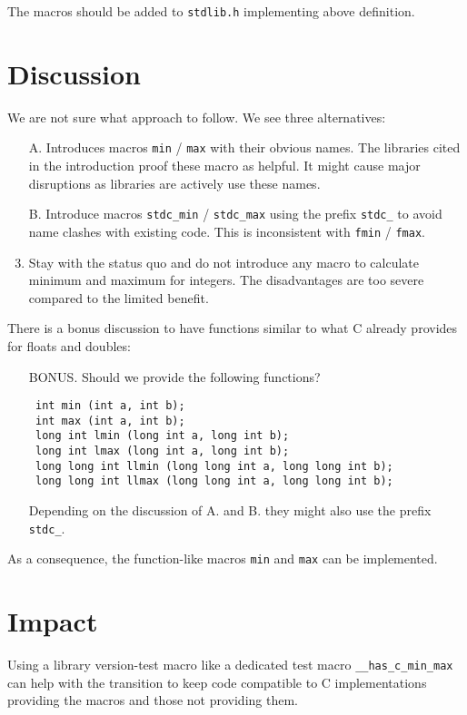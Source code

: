 \documentclass[a4paper,10pt]{scrartcl}
\begin{document}
The macros should be added to \lstinline{stdlib.h} implementing above definition.

\section{Discussion}
We are not sure what approach to follow. We see three alternatives:

\begin{enumerate}
 \item[A.] Introduces macros \lstinline{min} / \lstinline{max} with their obvious names. The
 libraries cited in the introduction proof these macro as helpful. It might cause major
 disruptions as libraries are actively use these names.
 \item[B.] Introduce macros \lstinline{stdc_min} / \lstinline{stdc_max} using the prefix \lstinline{stdc_} to
 avoid name clashes with existing code. This is inconsistent with \lstinline{fmin} / \lstinline{fmax}.
 \item[C.] Stay with the status quo and do not introduce any macro to calculate minimum and maximum for
 integers. The disadvantages are too severe compared to the limited benefit.
\end{enumerate}

There is a bonus discussion to have functions similar to what C already provides for floats and doubles:

\begin{enumerate}
 \item[BONUS.] Should we provide the following functions?
\begin{lstlisting}
 int min (int a, int b);
 int max (int a, int b);
 long int lmin (long int a, long int b);
 long int lmax (long int a, long int b);
 long long int llmin (long long int a, long long int b);
 long long int llmax (long long int a, long long int b);
\end{lstlisting}
Depending on the discussion of A. and B. they might also use the prefix \lstinline{stdc_}.
\end{enumerate}

As a consequence, the function-like macros \lstinline{min} and \lstinline{max} can be implemented.

\section{Impact}
Using a library version-test macro like a dedicated test macro \lstinline{__has_c_min_max} can
help with the transition to keep code compatible to C implementations providing the macros and
those not providing them.
\end{document}
